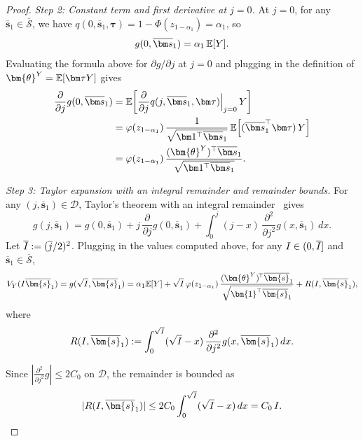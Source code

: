 \begin{proof}
  \emph{Step 2: Constant term and first derivative at $j=0$.}
  At $j=0$, for any $\overline{\bm s}_1\in\overline{\mathcal{S}}$, we have $q(0,\overline{\bm s}_1,\bm\tau)=1 - \Phi(z_{1-\alpha_1})=\alpha_1$, so
  \[
    g(0,\overline{\bm s}_1)=\alpha_1\,\E[Y].
  \]
  Evaluating the formula above for $\partial g/\partial j$ at $j=0$ and plugging in the definition of $\bm{\theta}^Y=\E[\bm\tau Y]$ gives
  \begin{align*}
    \frac{\partial}{\partial j}g(0,\overline{\bm s}_1)
    &=
    \E\!\left[
      \frac{\partial}{\partial j}q(j,\overline{\bm s}_1,\bm\tau)\Big|_{j=0}\,Y
    \right] \\
    &=
    \varphi(z_{1-\alpha_1})\,
    \frac{1}{\sqrt{\bm 1^\top\overline{\bm s}_1}}\,
    \E\!\left[
      (\overline{\bm s}_1^\top\bm\tau)\,Y
    \right] \\
    &=
    \varphi(z_{1-\alpha_1})\,
    \frac{(\bm{\theta}^Y)^\top\overline{\bm s}_1}{\sqrt{\bm 1^\top\overline{\bm s}_1}}.
  \end{align*}

  \emph{Step 3: Taylor expansion with an integral remainder and remainder bounds.}
  For any $(j,\overline{\bm s}_1)\in\mathcal D$, Taylor's theorem with an integral remainder~\cite[Theorem~2.55]{Folland23} gives
  \[
    g(j,\overline{\bm{s}}_1)
    =
    g(0,\overline{\bm{s}}_1)
    +j\,\frac{\partial}{\partial j}g(0,\overline{\bm{s}}_1)
    +\int_0^j (j-x)\,\frac{\partial^2}{\partial j^2}
    g(x,\overline{\bm{s}}_1)\,dx.
  \]
  Let $\overline{I}:= (\overline{j} / 2)^2$.
  Plugging in the values computed above, for any $I\in(0,\overline{I}]$ and $\overline{\bm s}_1\in\overline{\mathcal{S}}$,
  \[
    V_Y(\invst\overline{\bm{s}}_1)
    =
    g(\sqrt{\invst},\overline{\bm{s}}_1)
    =
    \alpha_1 \E[Y]
    +\sqrt{\invst}\,\varphi(z_{1-\alpha_1})\,
    \frac{(\bm{\theta}^Y)^{\!\top}\overline{\bm{s}}_1}{\sqrt{\bm{1}^{\top}\overline{\bm{s}}_1}}
    +R(\invst,\overline{\bm{s}}_1),
  \]
  where
  \[
    R(\invst,\overline{\bm{s}}_1)
    \defeq
    \int_0^{\sqrt{\invst}} (\sqrt{\invst}-x)\,\frac{\partial^2}{\partial j^2}
    g(x,\overline{\bm{s}}_1)\,dx.
  \]

  Since $|\frac{\partial^2}{\partial j^2} g|\le 2 C_0$ on $\mathcal D$, the remainder is bounded as
  \[
    |R(\invst,\overline{\bm{s}}_1)|
    \le
    2 C_0 \int_0^{\sqrt{\invst}}(\sqrt{\invst}-x)\,dx
    =
    C_0\,\invst.
  \]


\end{proof}
